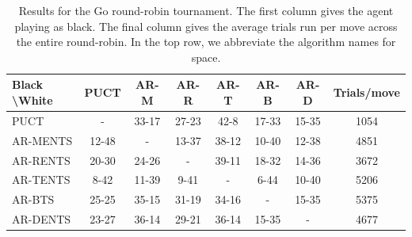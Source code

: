         \begin{table}[]
        \centering   
		    \begin{tabular}{l|cccccc|c} 
		        \textbf{Black \textbackslash White}     & PUCT  & AR-M  & AR-R  & AR-T  & AR-B  & AR-D   & Trials/move\\ 
		        \hline
		                                PUCT            &   -   & 33-17 & 27-23 & 42-8  & 17-33 & 15-35  & 1054 \\
		                                AR-MENTS        & 12-48 &   -   & 13-37 & 38-12 & 10-40 & 12-38  & 4851\\
		                                AR-RENTS        & 20-30 & 24-26 &   -   & 39-11 & 18-32 & 14-36  & 3672 \\
		                                AR-TENTS        &  8-42 & 11-39 &  9-41 &   -   &  6-44 & 10-40  & 5206 \\
		                                AR-BTS          & 25-25 & 35-15 & 31-19 & 34-16 &   -   & 15-35  & 5375 \\
		                                AR-DENTS        & 23-27 & 36-14 & 29-21 & 36-14 & 15-35 &   -    & 4677 \\         
		    \end{tabular}
            \caption{Results for the Go round-robin tournament. The first column gives the agent playing as black. The final column gives the average trials run per move across the entire round-robin. In the top row, we abbreviate the algorithm names for space.\label{table:go_results}}
        \end{table}


















































